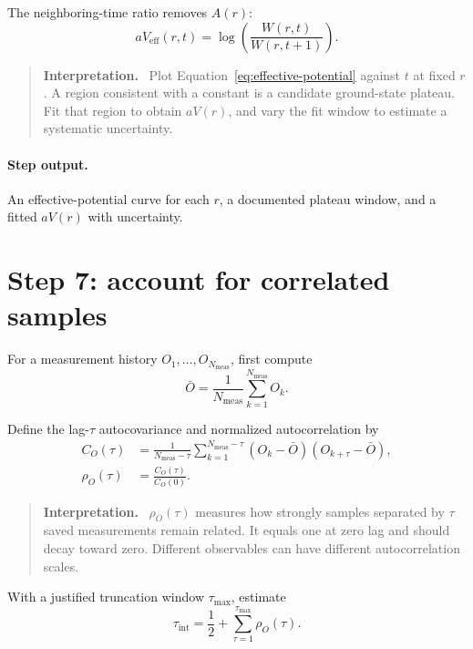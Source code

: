 \documentclass[11pt]{article}
\newcommand{\Nmeas}{N_{\mathrm{meas}}}
\newenvironment{interpretation}
  {\begin{quote}\small\noindent\textbf{Interpretation.}\ }
  {\end{quote}}
\begin{document}
The neighboring-time ratio removes \(A(r)\):
\begin{equation}
  aV_{\mathrm{eff}}(r,t)=
  \log\left(\frac{W(r,t)}{W(r,t+1)}\right).
  \label{eq:effective-potential}
\end{equation}

\begin{interpretation}
Plot Equation~\eqref{eq:effective-potential} against \(t\) at fixed \(r\).
A region consistent with a constant is a candidate ground-state plateau.
Fit that region to obtain \(aV(r)\), and vary the fit window to estimate a
systematic uncertainty.
\end{interpretation}

\paragraph{Step output.}
An effective-potential curve for each \(r\), a documented plateau window, and a
fitted \(aV(r)\) with uncertainty.

\section{Step 7: account for correlated samples}

For a measurement history \(O_1,\ldots,O_{\Nmeas}\), first compute
\begin{equation}
  \bar O=\frac{1}{\Nmeas}\sum_{k=1}^{\Nmeas}O_k.
  \label{eq:sample-mean}
\end{equation}

Define the lag-\(\tau\) autocovariance and normalized autocorrelation by
\begin{align}
  C_O(\tau)
  &=
  \frac{1}{\Nmeas-\tau}
  \sum_{k=1}^{\Nmeas-\tau}
  (O_k-\bar O)(O_{k+\tau}-\bar O),
  \label{eq:autocovariance}\\
  \rho_O(\tau)&=\frac{C_O(\tau)}{C_O(0)}.
  \label{eq:autocorrelation}
\end{align}

\begin{interpretation}
\(\rho_O(\tau)\) measures how strongly samples separated by \(\tau\) saved
measurements remain related. It equals one at zero lag and should decay toward
zero. Different observables can have different autocorrelation scales.
\end{interpretation}

With a justified truncation window \(\tau_{\max}\), estimate
\begin{equation}
  \tau_{\mathrm{int}}=
  \frac{1}{2}+
  \sum_{\tau=1}^{\tau_{\max}}\rho_O(\tau).
  \label{eq:integrated-autocorrelation}
\end{equation}
\end{document}
